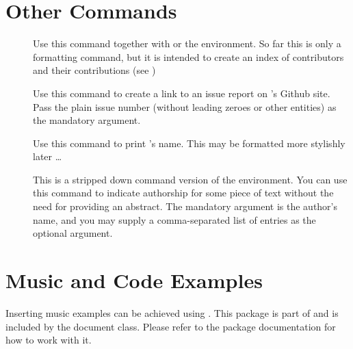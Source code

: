 \documentclass[openLilyLib_CG]{subfiles}
\begin{document}
\section{Other Commands}
\begin{description}
\item[] Use this command together with  or the  environment.
So far this is only a formatting command, but it is intended to create an index of contributors and their contributions (see )
\item[] Use this command to create a link to an issue report on \openlilylib's Github site.
Pass the plain issue number (without leading zeroes or other entities) as the mandatory argument.
\item[] Use this command to print \openlilylib's name.
This may be formatted more stylishly later \dots
\item[] This is a stripped down command version of the  environment.
You can use this command to indicate authorship for some piece of text without the need for providing an abstract.
The mandatory argument is the author's name, and you may supply a comma-separated list of  entries as the optional argument.
\end{description}

\section{Music and Code Examples}
Inserting music examples can be achieved using .
This package is part of \openlilylib{} and is included by the document class.
Please refer to the package documentation for how to work with it.

\end{document}
